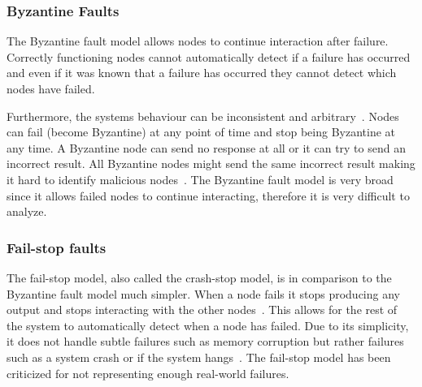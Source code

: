 \documentclass{cslthse-msc}
\begin{document}
\subsubsection{Byzantine Faults} \label{subsub:background_byzantine}
The Byzantine fault model allows nodes to continue interaction after failure. Correctly functioning nodes cannot automatically detect if a failure has occurred and even if it was known that a failure has occurred they cannot detect which nodes have failed. 

Furthermore, the systems behaviour can be inconsistent and arbitrary~\cite{surveyFaultParallel}. Nodes can fail (become Byzantine) at any point of time and stop being Byzantine at any time. A Byzantine node can send no response at all or it can try to send an incorrect result. All Byzantine nodes might send the same incorrect result making it hard to identify malicious nodes~\cite{selfAdaptRel}. %
The Byzantine fault model is very broad since it allows failed nodes to continue interacting, therefore it is very difficult to analyze.


\subsubsection{Fail-stop faults} \label{subsub:background_fail_stop}
The fail-stop model, also called the crash-stop model, is in comparison to the Byzantine fault model much simpler. When a node fails it stops producing any output and stops interacting with the other nodes~\cite{faultTolerantFundamentals}. This allows for the rest of the system to automatically detect when a node has failed. Due to its simplicity, it does not handle subtle failures such as memory corruption but rather failures such as a system crash or if the system hangs~\cite{surveyFaultParallel}. The fail-stop model has been criticized for not representing enough real-world failures.

\end{document}
